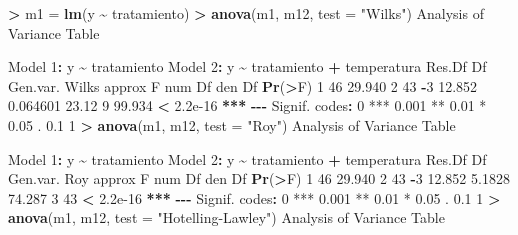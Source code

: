 \documentclass[
  a4paper,
  oneside]{scrbook}
\newenvironment{Shaded}{\begin{snugshade}}{\end{snugshade}}
\newcommand{\AttributeTok}[1]{\textcolor[rgb]{0.13,0.29,0.53}{#1}}
\newcommand{\DecValTok}[1]{\textcolor[rgb]{0.00,0.00,0.81}{#1}}
\newcommand{\ErrorTok}[1]{\textcolor[rgb]{0.64,0.00,0.00}{\textbf{#1}}}
\newcommand{\FloatTok}[1]{\textcolor[rgb]{0.00,0.00,0.81}{#1}}
\newcommand{\FunctionTok}[1]{\textcolor[rgb]{0.13,0.29,0.53}{\textbf{#1}}}
\newcommand{\NormalTok}[1]{#1}
\newcommand{\OtherTok}[1]{\textcolor[rgb]{0.56,0.35,0.01}{#1}}
\newcommand{\SpecialCharTok}[1]{\textcolor[rgb]{0.81,0.36,0.00}{\textbf{#1}}}
\newcommand{\StringTok}[1]{\textcolor[rgb]{0.31,0.60,0.02}{#1}}
\theoremstyle{definition}
\theoremstyle{definition}
\theoremstyle{definition}
\theoremstyle{definition}
\theoremstyle{remark}
\begin{document}
\begin{Shaded}
\begin{Highlighting}[]
\SpecialCharTok{\textgreater{}}\NormalTok{ m1 }\OtherTok{=} \FunctionTok{lm}\NormalTok{(y }\SpecialCharTok{\textasciitilde{}}\NormalTok{ tratamiento)}
\SpecialCharTok{\textgreater{}} \FunctionTok{anova}\NormalTok{(m1, m12, }\AttributeTok{test =} \StringTok{"Wilks"}\NormalTok{)}
\NormalTok{Analysis of Variance Table}

\NormalTok{Model }\DecValTok{1}\SpecialCharTok{:}\NormalTok{ y }\SpecialCharTok{\textasciitilde{}}\NormalTok{ tratamiento}
\NormalTok{Model }\DecValTok{2}\SpecialCharTok{:}\NormalTok{ y }\SpecialCharTok{\textasciitilde{}}\NormalTok{ tratamiento }\SpecialCharTok{+}\NormalTok{ temperatura}
\NormalTok{  Res.Df Df Gen.var.    Wilks approx F num Df den Df    }\FunctionTok{Pr}\NormalTok{(}\SpecialCharTok{\textgreater{}}\NormalTok{F)    }
\DecValTok{1}     \DecValTok{46}      \FloatTok{29.940}                                              
\DecValTok{2}     \DecValTok{43} \SpecialCharTok{{-}}\DecValTok{3}   \FloatTok{12.852} \FloatTok{0.064601}    \FloatTok{23.12}      \DecValTok{9} \FloatTok{99.934} \SpecialCharTok{\textless{}} \FloatTok{2.2e{-}16} \SpecialCharTok{**}\ErrorTok{*}
\SpecialCharTok{{-}{-}{-}}
\NormalTok{Signif. codes}\SpecialCharTok{:}  \DecValTok{0} \StringTok{\textquotesingle{}***\textquotesingle{}} \FloatTok{0.001} \StringTok{\textquotesingle{}**\textquotesingle{}} \FloatTok{0.01} \StringTok{\textquotesingle{}*\textquotesingle{}} \FloatTok{0.05} \StringTok{\textquotesingle{}.\textquotesingle{}} \FloatTok{0.1} \StringTok{\textquotesingle{} \textquotesingle{}} \DecValTok{1}
\SpecialCharTok{\textgreater{}} \FunctionTok{anova}\NormalTok{(m1, m12, }\AttributeTok{test =} \StringTok{"Roy"}\NormalTok{)}
\NormalTok{Analysis of Variance Table}

\NormalTok{Model }\DecValTok{1}\SpecialCharTok{:}\NormalTok{ y }\SpecialCharTok{\textasciitilde{}}\NormalTok{ tratamiento}
\NormalTok{Model }\DecValTok{2}\SpecialCharTok{:}\NormalTok{ y }\SpecialCharTok{\textasciitilde{}}\NormalTok{ tratamiento }\SpecialCharTok{+}\NormalTok{ temperatura}
\NormalTok{  Res.Df Df Gen.var.    Roy approx F num Df den Df    }\FunctionTok{Pr}\NormalTok{(}\SpecialCharTok{\textgreater{}}\NormalTok{F)    }
\DecValTok{1}     \DecValTok{46}      \FloatTok{29.940}                                            
\DecValTok{2}     \DecValTok{43} \SpecialCharTok{{-}}\DecValTok{3}   \FloatTok{12.852} \FloatTok{5.1828}   \FloatTok{74.287}      \DecValTok{3}     \DecValTok{43} \SpecialCharTok{\textless{}} \FloatTok{2.2e{-}16} \SpecialCharTok{**}\ErrorTok{*}
\SpecialCharTok{{-}{-}{-}}
\NormalTok{Signif. codes}\SpecialCharTok{:}  \DecValTok{0} \StringTok{\textquotesingle{}***\textquotesingle{}} \FloatTok{0.001} \StringTok{\textquotesingle{}**\textquotesingle{}} \FloatTok{0.01} \StringTok{\textquotesingle{}*\textquotesingle{}} \FloatTok{0.05} \StringTok{\textquotesingle{}.\textquotesingle{}} \FloatTok{0.1} \StringTok{\textquotesingle{} \textquotesingle{}} \DecValTok{1}
\SpecialCharTok{\textgreater{}} \FunctionTok{anova}\NormalTok{(m1, m12, }\AttributeTok{test =} \StringTok{"Hotelling{-}Lawley"}\NormalTok{)}
\NormalTok{Analysis of Variance Table}


\end{Highlighting}
\end{Shaded}
\end{document}
